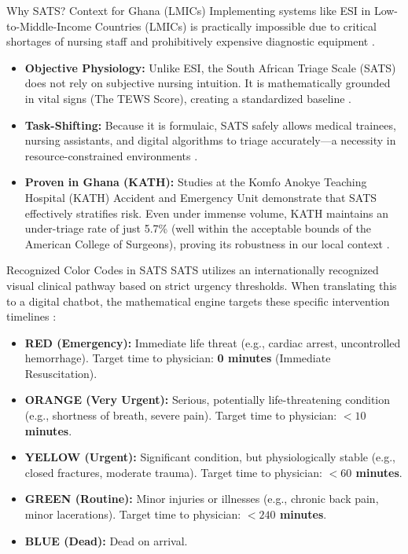 \documentclass[aspectratio=169]{beamer}
\begin{document}
	\begin{frame}{Why SATS? Context for Ghana (LMICs)}
		Implementing systems like ESI in Low-to-Middle-Income Countries (LMICs) is practically impossible due to critical shortages of nursing staff and prohibitively expensive diagnostic equipment \cite{Mitchell2023, Mitchell2021}.
		\vspace{0.2cm}
		\begin{itemize}
			\item \textbf{Objective Physiology:} Unlike ESI, the South African Triage Scale (SATS) does not rely on subjective nursing intuition. It is mathematically grounded in vital signs (The TEWS Score), creating a standardized baseline \cite{SATS2012}.
			\item \textbf{Task-Shifting:} Because it is formulaic, SATS safely allows medical trainees, nursing assistants, and digital algorithms to triage accurately—a necessity in resource-constrained environments \cite{Gyedu2016, Conti2022}.
			\item \textbf{Proven in Ghana (KATH):} Studies at the Komfo Anokye Teaching Hospital (KATH) Accident and Emergency Unit demonstrate that SATS effectively stratifies risk. Even under immense volume, KATH maintains an under-triage rate of just 5.7\% (well within the acceptable bounds of the American College of Surgeons), proving its robustness in our local context \cite{Rominski2014}.
		\end{itemize}
	\end{frame}
	
	\begin{frame}{Recognized Color Codes in SATS}
		SATS utilizes an internationally recognized visual clinical pathway based on strict urgency thresholds. When translating this to a digital chatbot, the mathematical engine targets these specific intervention timelines \cite{SATS2012}:
		\vspace{0.2cm}
		\begin{itemize}
			\item \textcolor{triagered}{\textbf{RED (Emergency):}} Immediate life threat (e.g., cardiac arrest, uncontrolled hemorrhage). Target time to physician: \textbf{0 minutes} (Immediate Resuscitation).
			\item \textcolor{triageorange}{\textbf{ORANGE (Very Urgent):}} Serious, potentially life-threatening condition (e.g., shortness of breath, severe pain). Target time to physician: \textbf{$<10$ minutes}.
			\item \textcolor{triageyellow}{\textbf{YELLOW (Urgent):}} Significant condition, but physiologically stable (e.g., closed fractures, moderate trauma). Target time to physician: \textbf{$<60$ minutes}.
			\item \textcolor{triagegreen}{\textbf{GREEN (Routine):}} Minor injuries or illnesses (e.g., chronic back pain, minor lacerations). Target time to physician: \textbf{$<240$ minutes}.
			\item \textcolor{triageblue}{\textbf{BLUE (Dead):}} Dead on arrival.
		\end{itemize}
	\end{frame}
\end{document}
